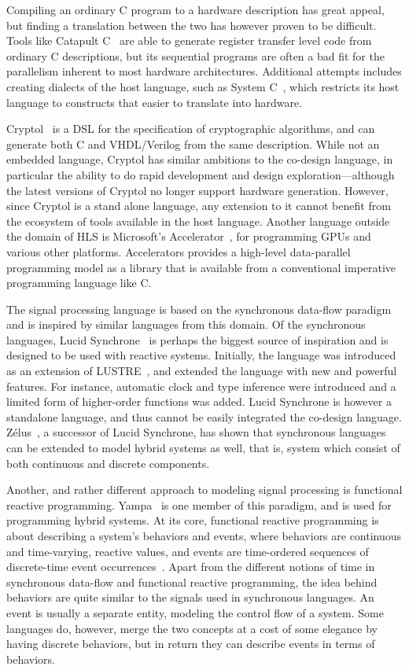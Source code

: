 \documentclass[../paper.tex]{subfiles}
\begin{document}
Compiling an ordinary C program to a hardware description has great appeal, but finding a translation between the two has however proven to be difficult. Tools like Catapult C~\cite{graphics2008} are able to generate register transfer level code from ordinary C descriptions, but its sequential programs are often a bad fit for the parallelism inherent to most hardware architectures. Additional attempts includes creating dialects of the host language, such as System C~\cite{ghenassia2005}, which restricts its host language to constructs that easier to translate into hardware.

Cryptol~\cite{cryptol} is a DSL for the specification of cryptographic algorithms, and can generate both C and VHDL/Verilog from the same description. While not an embedded language, Cryptol has similar ambitions to the co-design language, in particular the ability to do rapid development and design exploration---although the latest versions of Cryptol no longer support hardware generation. However, since Cryptol is a stand alone language, any extension to it cannot benefit from the ecosystem of tools available in the host language. Another language outside the domain of HLS is Microsoft's Accelerator~\cite{accelerator}, for programming GPUs and various other platforms. Accelerators provides a high-level data-parallel programming model as a library that is available from a conventional imperative programming language like C.

The signal processing language is based on the synchronous data-flow paradigm and is inspired by similar languages from this domain. Of the synchronous languages, Lucid Synchrone~\cite{pouzet2006, colaco2004} is perhaps the biggest source of inspiration and is designed to be used with reactive systems. Initially, the language was introduced as an extension of LUSTRE~\cite{hu1998}, and extended the language with new and powerful features. For instance, automatic clock and type inference were introduced and a limited form of higher-order functions was added. Lucid Synchrone is however a standalone language, and thus cannot be easily integrated the co-design language. Z{\'e}lus~\cite{zelus2013}, a successor of Lucid Synchrone, has shown that synchronous languages can be extended to model hybrid systems as well, that is, system which consist of both continuous and discrete components.

Another, and rather different approach to modeling signal processing is functional reactive programming. Yampa~\cite{yampa2003} is one member of this paradigm, and is used for programming hybrid systems. At its core, functional reactive programming is about describing a system's behaviors and events, where behaviors are continuous and time-varying, reactive values, and events are time-ordered sequences of discrete-time event occurrences~\cite{nilsson2002}. Apart from the different notions of time in synchronous data-flow and functional reactive programming, the idea behind behaviors are quite similar to the signals used in synchronous languages. An event is usually a separate entity, modeling the control flow of a system. Some languages do, however, merge the two concepts at a cost of some elegance by having discrete behaviors, but in return they can describe events in terms of behaviors.
\end{document}
